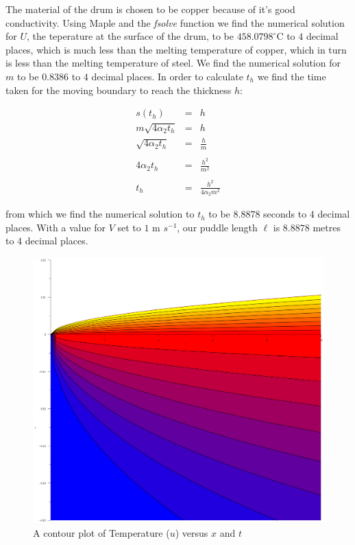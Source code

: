 \documentclass{report}
\begin{document}
The material of the drum is chosen to be copper because of it's good conductivity. Using Maple and the 
\emph{fsolve} function we find the numerical solution for $U$, the teperature at the surface of the drum, 
to be $458.0798^{\circ}\mathrm{C}$ to $4$ decimal places, which is much less than the melting temperature 
of copper, which in turn is less than the melting temperature of steel. We find the numerical solution for 
$m$ to be $0.8386$ to $4$ decimal places. In order to calculate $t_h$ we find the time taken for the moving 
boundary to reach the thickness $h$:\bigskip

\begin{eqnarray*}
                   s(t_h) & = & h \\
  m \sqrt{4 \alpha_2 t_h} & = & h \\
    \sqrt{4 \alpha_2 t_h} & = & \frac{h}{m} \\\\
           4 \alpha_2 t_h & = & \frac{h^2}{m^2} \\\\
                      t_h & = & \frac{h^2}{4 \alpha_2 m^2} 
\end{eqnarray*}\medskip

from which we find the numerical solution to $t_h$ to be $8.8878$ seconds to $4$ decimal places. With a 
value for $V$ set to $1$ m $s^{-1}$, our puddle length $\ell$ is $8.8878$ metres to $4$ decimal places.

\begin{figure}[h]
\centering
\includegraphics[scale = 0.15]{s-vs-t-contour-cc}
\caption{A contour plot of Temperature ($u$) versus $x$ and $t$}
\label{fig:s-vs-t-contour-cc}
\end{figure}
\end{document}
